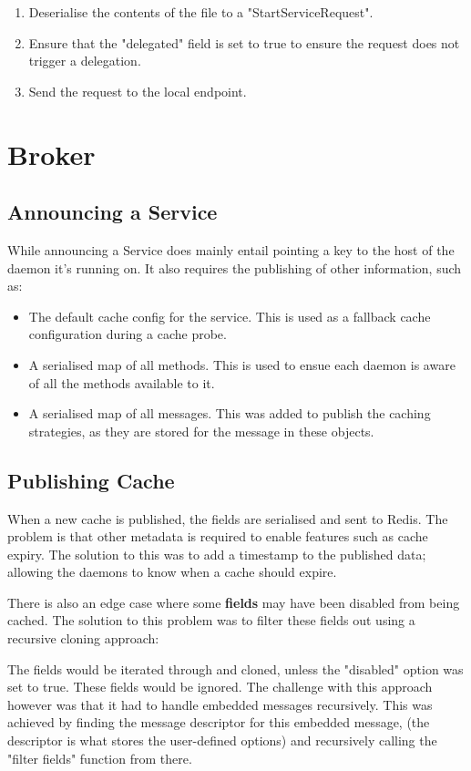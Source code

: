 \documentclass[a4paper,12pt]{report}
\begin{document}
\begin{enumerate}
    \item Deserialise the contents of the file to a "StartServiceRequest".
    \item Ensure that the "delegated" field is set to true to ensure the request does not trigger a delegation.
    \item Send the request to the local  endpoint.
\end{enumerate}

\section{Broker}
\subsection{Announcing a Service}
While announcing a Service does mainly entail pointing a key to the host of the daemon it's running on. It also requires the publishing of other information, such as:

\begin{itemize}
    \item The default cache config for the service. This is used as a fallback cache configuration during a cache probe.
    \item A serialised map of all methods. This is used to ensue each daemon is aware of all the methods available to it.
    \item A serialised map of all messages. This was added to publish the caching strategies, as they are stored for the message in these objects.
\end{itemize}

\subsection{Publishing Cache}
When a new cache is published, the fields are serialised and sent to Redis.
The problem is that other metadata is required to enable features such as cache expiry.
The solution to this was to add a timestamp to the published data; allowing the daemons to know when a cache should expire.

There is also an edge case where some \textbf{fields} may have been disabled from being cached. 
The solution to this problem was to filter these fields out using a recursive cloning approach:

The fields would be iterated through and cloned, unless the "disabled" option was set to true. These fields would be ignored.
The challenge with this approach however was that it had to handle embedded messages recursively. This was achieved by finding the message descriptor for this embedded message, (the descriptor is what stores the user-defined options) and recursively calling the "filter fields" function from there.
\end{document}
